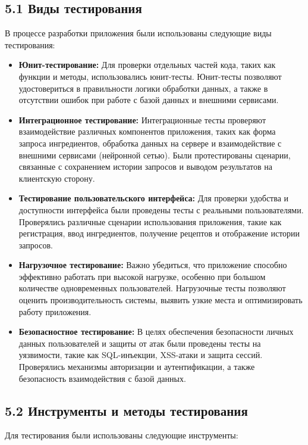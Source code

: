 {\subsection*{5.1 Виды тестирования}

В процессе разработки приложения были использованы следующие виды тестирования:

\begin{itemize}
    \item \textbf{Юнит-тестирование:} Для проверки отдельных частей кода, таких как функции и методы, использовались юнит-тесты. Юнит-тесты позволяют удостовериться в правильности логики обработки данных, а также в отсутствии ошибок при работе с базой данных и внешними сервисами.
    \item \textbf{Интеграционное тестирование:} Интеграционные тесты проверяют взаимодействие различных компонентов приложения, таких как форма запроса ингредиентов, обработка данных на сервере и взаимодействие с внешними сервисами (нейронной сетью). Были протестированы сценарии, связанные с сохранением истории запросов и выводом результатов на клиентскую сторону.
    \item \textbf{Тестирование пользовательского интерфейса:} Для проверки удобства и доступности интерфейса были проведены тесты с реальными пользователями. Проверялись различные сценарии использования приложения, такие как регистрация, ввод ингредиентов, получение рецептов и отображение истории запросов.
    \item \textbf{Нагрузочное тестирование:} Важно убедиться, что приложение способно эффективно работать при высокой нагрузке, особенно при большом количестве одновременных пользователей. Нагрузочные тесты позволяют оценить производительность системы, выявить узкие места и оптимизировать работу приложения.
    \item \textbf{Безопасностное тестирование:} В целях обеспечения безопасности личных данных пользователей и защиты от атак были проведены тесты на уязвимости, такие как SQL-инъекции, XSS-атаки и защита сессий. Проверялись механизмы авторизации и аутентификации, а также безопасность взаимодействия с базой данных.
\end{itemize}

\subsection*{5.2 Инструменты и методы тестирования}

Для тестирования были использованы следующие инструменты:

}

